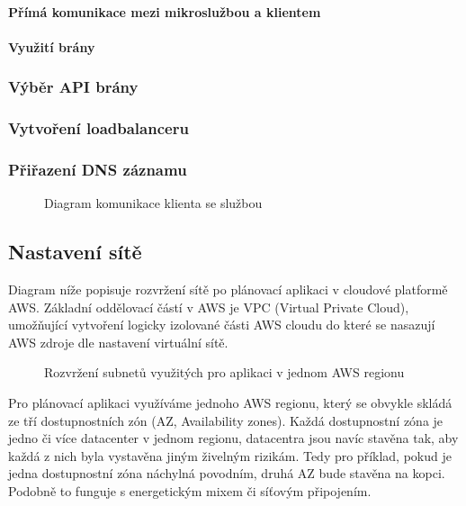 \documentclass[thesis=M,czech]{FITthesis}[2019/12/23]
\theoremstyle{plain}
\theoremstyle{definition}
\begin{document}
 \paragraph{Přímá komunikace mezi mikroslužbou a klientem}

 \paragraph{Využití brány}



\subsubsection{Výběr API brány}
\subsubsection{Vytvoření loadbalanceru}
\subsubsection{Přiřazení DNS záznamu}


\begin{figure}[H]\centering
	

	\caption[Diagram komunikace klienta se službou]{Diagram komunikace klienta se službou}\label{fig:float}
\end{figure}



\subsection{Nastavení sítě}

Diagram níže popisuje rozvržení sítě po plánovací aplikaci v cloudové platformě AWS. Základní oddělovací částí v AWS je VPC (Virtual Private Cloud)\cite{aws-vpc}, umožňující vytvoření logicky izolované části AWS cloudu do které se nasazují AWS zdroje dle nastavení virtuální sítě.

\begin{figure}[H]\centering
	

	\caption[Rozvržení subnetů využitých pro aplikaci v jednom AWS regionu]{Rozvržení subnetů využitých pro aplikaci v jednom AWS regionu}\label{fig:float}
\end{figure}

Pro plánovací aplikaci využíváme jednoho AWS regionu, který se obvykle skládá ze tří dostupnostních zón (AZ, Availability zones)\cite{aws-azs}. Každá dostupnostní zóna je jedno či více datacenter v jednom regionu, datacentra jsou navíc stavěna tak, aby každá z nich byla vystavěna jiným živelným rizikám. Tedy pro příklad, pokud je jedna dostupnostní zóna náchylná povodním, druhá AZ bude stavěna na kopci. Podobně to funguje s energetickým mixem či síťovým připojením. 
\end{document}
